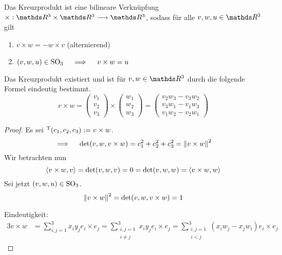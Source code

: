 		\begin{definition}[Kreuzprodukt]
			Das Kreuzprodukt ist eine bilineare Verknüpfung $\times:\SR^3\times\SR^3\longrightarrow\SR^3$, sodass für alle $v,w,u\in\SR^3$ gilt
			\begin{enumerate}[label=\normalfont(K\arabic*)]
				\item $v\times w = -w\times v$ \hfill (alternierend)
				\item $(v,w,u)\in\mathrm{SO}_3 \quad \implies \quad v\times w = u$
			\end{enumerate}
		\end{definition}

		\begin{theorem}
			Das Kreuzprodukt existiert und ist für $v,w\in\SR^3$ durch die folgende Formel eindeutig bestimmt.
			\[
				v\times w =
				\begin{pmatrix}
					v_1 \\ v_2 \\ v_3
				\end{pmatrix}
				\times
				\begin{pmatrix}
					w_1 \\ w_2 \\ w_3
				\end{pmatrix}
				=
				\begin{pmatrix}
					v_2w_3 - v_3w_2 \\
					v_3w_1 - v_1w_3 \\
					v_1w_2 - v_2w_1
				\end{pmatrix}
			\]
		\end{theorem}
		\begin{proof}
			Es sei $^\mathrm{T}{(c_1,c_2,c_3)}:=v\times w$.
			\[ \implies \quad \det(v,w,v\times w) = c_1^2 + c_2^2 + c_3^2 = \left\| v\times w \right\|^2 \]
			Wir betrachten nun
			\[ \left\langle v\times w, v \right\rangle = \det(v,w,v) = 0 = \det(v,w,w) = \left\langle v\times w, w \right\rangle \]
			Sei jetzt $(v,w,u)\in\mathrm{SO}_3$.
			\[ \left\| v\times w \right\|^2 = \det(v,w,v\times w) = 1 \]

			Eindeutigkeit:
			\begin{alignat*}{3}
				v\times w &= \sum_{i,j=1}^3 x_iy_j e_i\times e_j
				= \sum_{\substack{i,j=1 \\ i\neq j}}^3 x_iy_j e_i\times e_j
				= \sum_{\substack{i,j=1 \\ i < j}}^3 (x_iw_j - x_jw_i) e_i\times e_j
			\end{alignat*}
		\end{proof}

